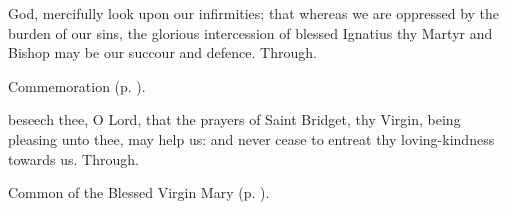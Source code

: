 {} God, mercifully look upon our infirmities; that whereas we are oppressed by the burden of our sins, the glorious intercession of blessed Ignatius thy Martyr and Bishop may be our succour and defence. Through.

\begin{rubric}
    Commemoration  (p. \pageref{BridgetCollect}).
\end{rubric}


\clearpage
{}


\memorialCollect\label{BridgetCollect}
 beseech thee, O Lord, that the prayers of Saint Bridget, thy Virgin, being pleasing unto thee, may help us: and never cease to entreat thy loving-kindness towards us. Through.



\begin{rubric}
	Common of the Blessed Virgin Mary (p. \pageref{CommonBVM}).
\end{rubric}


